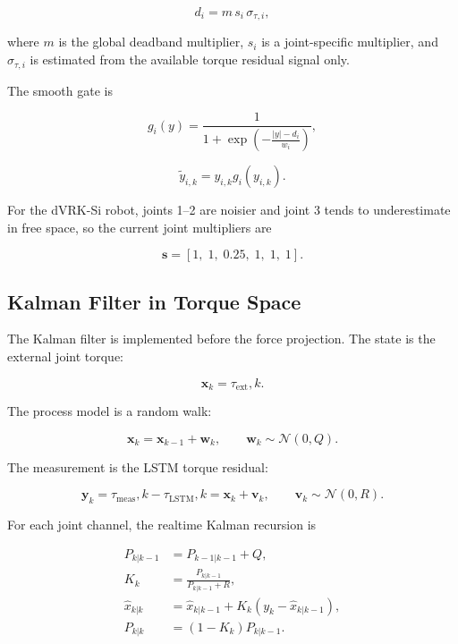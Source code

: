 \documentclass[11pt]{article}
\newcommand{\tauext}{\tau_{\mathrm{ext}}}
\newcommand{\taumeas}{\tau_{\mathrm{meas}}}
\newcommand{\taulstm}{\tau_{\mathrm{LSTM}}}
\begin{document}
\begin{equation}
d_i
= m \, s_i \, \sigma_{\tau,i},
\end{equation}

where \(m\) is the global deadband multiplier, \(s_i\) is a joint-specific
multiplier, and \(\sigma_{\tau,i}\) is estimated from the available torque
residual signal only.

The smooth gate is

\begin{equation}
g_i(y)
= \frac{1}
{1 + \exp\left(-\frac{|y|-d_i}{w_i}\right)},
\end{equation}

\begin{equation}
\tilde{y}_{i,k}
= y_{i,k} g_i(y_{i,k}).
\end{equation}

For the dVRK-Si robot, joints 1--2 are noisier and joint 3 tends to
underestimate in free space, so the current joint multipliers are

\begin{equation}
\bm s = [1,\;1,\;0.25,\;1,\;1,\;1].
\end{equation}

\subsection{Kalman Filter in Torque Space}

The Kalman filter is implemented before the force projection. The state is the
external joint torque:

\begin{equation}
\bm x_k = \tauext,k .
\end{equation}

The process model is a random walk:

\begin{equation}
\bm x_k = \bm x_{k-1} + \bm w_k,
\qquad
\bm w_k \sim \mathcal{N}(0,Q).
\end{equation}

The measurement is the LSTM torque residual:

\begin{equation}
\bm y_k
= \taumeas,k - \taulstm,k
= \bm x_k + \bm v_k,
\qquad
\bm v_k \sim \mathcal{N}(0,R).
\end{equation}

For each joint channel, the realtime Kalman recursion is

\begin{align}
P_{k|k-1} &= P_{k-1|k-1} + Q,\\
K_k &= \frac{P_{k|k-1}}{P_{k|k-1}+R},\\
\hat{x}_{k|k} &= \hat{x}_{k|k-1}
  + K_k(y_k-\hat{x}_{k|k-1}),\\
P_{k|k} &= (1-K_k)P_{k|k-1}.
\end{align}
\end{document}
